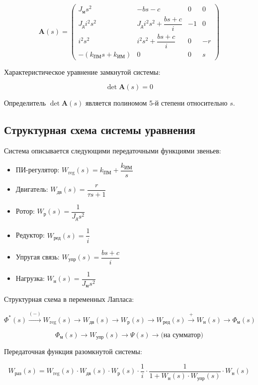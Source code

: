 \documentclass[14pt]{extreport}
\begin{document}
{\[
\mathbf{A}(s) = \begin{pmatrix}
J_{\text{м}} s^2 & -b s - c & 0 & 0 \\[4pt]
J_{\text{д}} i^2 s^2 & J_{\text{д}} i^2 s^2 + \dfrac{b s + c}{i} & -1 & 0 \\[4pt]
i^2 s^2 & i^2 s^2 + \dfrac{b s + c}{i} & 0 & -r \\[4pt]
-(k_{\text{ПМ}} s + k_{\text{ИМ}}) & 0 & 0 & s
\end{pmatrix}
\]

Характеристическое уравнение замкнутой системы:

\[
\det \mathbf{A}(s) = 0
\]

Определитель \( \det \mathbf{A}(s) \) является полиномом 5-й степени относительно \(s\).


        \subsection{Структурная схема системы уравнения}
        Система описывается следующими передаточными функциями звеньев:

\begin{itemize}
    \item ПИ-регулятор: \quad $W_{\text{reg}}(s) = k_{\text{ПМ}} + \dfrac{k_{\text{ИМ}}}{s}$
    \item Двигатель: \quad $W_{\text{дв}}(s) = \dfrac{r}{\tau s + 1}$
    \item Ротор: \quad $W_{\text{р}}(s) = \dfrac{1}{J_{\text{д}} s^2}$
    \item Редуктор: \quad $W_{\text{ред}}(s) = \dfrac{1}{i}$
    \item Упругая связь: \quad $W_{\text{упр}}(s) = \dfrac{b s + c}{i}$
    \item Нагрузка: \quad $W_{\text{н}}(s) = \dfrac{1}{J_{\text{м}} s^2}$
\end{itemize}

Структурная схема в переменных Лапласа:

\[
\Phi^*(s) \xrightarrow{(-)} W_{\text{reg}}(s) \xrightarrow{} W_{\text{дв}}(s) \xrightarrow{} W_{\text{р}}(s) \xrightarrow{} W_{\text{ред}}(s) \xrightarrow{+} W_{\text{н}}(s) \xrightarrow{} \Phi_{\text{м}}(s)
\]

\[
\Phi_{\text{м}}(s) \xrightarrow{} W_{\text{упр}}(s) \xrightarrow{} \Psi(s) \xrightarrow{} \text{(на сумматор)}
\]

Передаточная функция разомкнутой системы:

\[
W_{\text{раз}}(s) = W_{\text{reg}}(s) \cdot W_{\text{дв}}(s) \cdot W_{\text{р}}(s) \cdot \frac{1}{i} \cdot \frac{1}{1 + W_{\text{н}}(s) \cdot W_{\text{упр}}(s)} \cdot W_{\text{н}}(s)
\]

}
\end{document}
